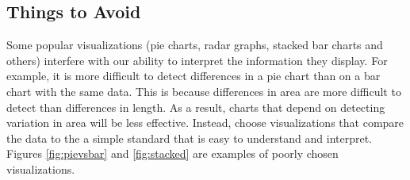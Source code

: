 \subsection*{Things to Avoid} %

Some popular visualizations (pie charts, radar graphs, stacked bar charts and others) interfere with our ability to interpret the information they display.
For example, it is more difficult to detect differences in a pie chart than on a bar chart with the same data.
This is because differences in area are more difficult to detect than differences in length. 
As a result, charts that depend on detecting variation in area will be less effective.
Instead, choose visualizations that compare the data to the a simple standard that is easy to understand and interpret.
Figures \ref{fig:pievsbar} and \ref{fig:stacked} are examples of poorly chosen visualizations.

